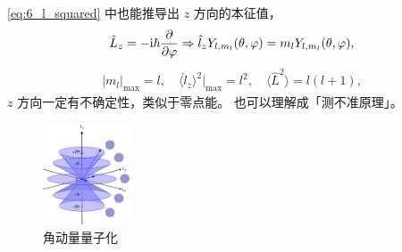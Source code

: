 \eqref{eq:6_l_squared} 中也能推导出 $z$ 方向的本征值，
\begin{align}
    \hat L_z = -\mathrm{i}\hbar \pdv{\varphi} \Rightarrow \hat l_z Y_{l,m_l}(\theta, \varphi) = m_l Y_{l,m_l}(\theta, \varphi), 
\end{align}
\begin{align}
    |m_l|_{\mathrm{max}} = l, \quad \langle \hat l_z \rangle ^2 |_{\mathrm{max}} = l^2, 
    \quad \langle \hat L^2 \rangle = l(l+1),
\end{align}
$z$ 方向一定有不确定性，类似于零点能。
也可以理解成「测不准原理」。
\begin{figure}
    \centering
    \includegraphics[height=3cm]{fig/angular_momentum_Wikipedia.pdf}
    \caption{角动量量子化}
\end{figure}


